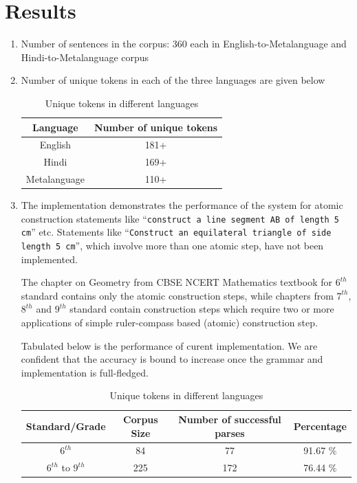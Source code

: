\def\DevnagVersion{2.15}\documentclass[12pt]{article}
\begin{document}
\section{Results}
\begin{enumerate}
\item Number of sentences in the corpus: 360 each in English-to-Metalanguage and Hindi-to-Metalanguage corpus 
\item Number of unique tokens in each of the three languages are given below

\begin{table}[H]
\label{table:tokens}
\smallskip
\begin{center}
\begin{tabular}{cc}
\hline
\bf{Language} & \bf{Number of unique tokens}\\[0.2cm]\hline
English & 181+\\
Hindi & 169+\\
Metalanguage & 110+\\
\hline
\end{tabular}
\caption{Unique tokens in different languages}
\end{center}
\end{table}


\item The implementation demonstrates the performance of the system for atomic construction statements like ``\texttt{construct a line segment AB of length 5 cm}'' etc. Statements like ``\texttt{Construct an equilateral triangle of side length 5 cm}'', which involve more than one atomic step, have not been implemented.

The chapter on Geometry from CBSE NCERT Mathematics textbook for $6^{th}$ standard contains only the atomic construction steps, while chapters from $7^{th}$, $8^{th}$ and $9^{th}$ standard contain construction steps which require two or more applications of simple ruler-compass based (atomic) construction step.

Tabulated below is the performance of curent implementation. We are confident that the accuracy is bound to increase once the grammar and implementation is full-fledged.

\begin{table}[H]
\label{table:accuracy}
\smallskip
\begin{center}
\begin{tabular}{cccc}
\hline
\bf{Standard/Grade} & \bf{Corpus Size} & \bf{Number of successful parses} & \bf{Percentage}\\[0.2cm]\hline
$6^{th}$ & 84 & 77 & 91.67 \%\\
$6^{th}$ to $9^{th}$ & 225 & 172 & 76.44 \%\\
\hline
\end{tabular}
\caption{Unique tokens in different languages}
\end{center}
\end{table}

\end{enumerate}
\end{document}
